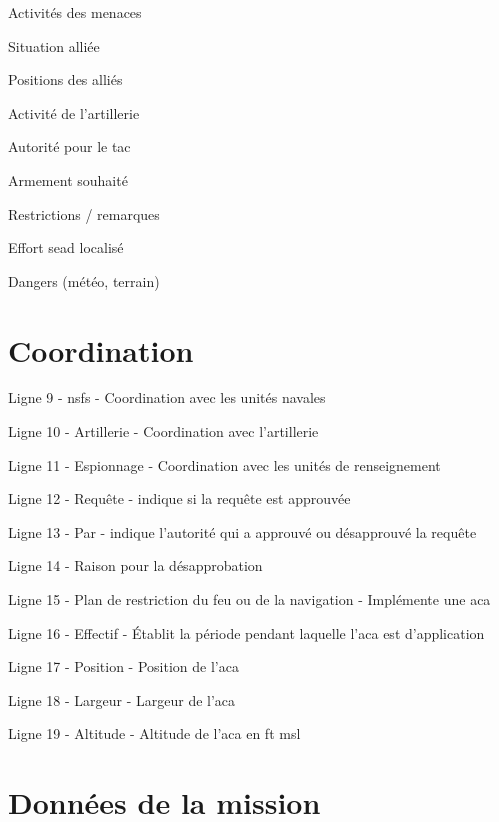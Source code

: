 \begin{e2}[0em]
\begin{e3}[0em]
		\item Activités des menaces
		\item Situation alliée
		\item Positions des alliés
		\item Activité de l'artillerie
		\item Autorité pour le \gls{tac}
		\item Armement souhaité
		\item Restrictions / remarques
		\item Effort \gls{sead} localisé
		\item Dangers (météo, terrain)
	\end{e3}
\end{e2}

\section{Coordination}

\begin{re2}
	\item Ligne 9 - \gls{nsfs} - Coordination avec les unités navales
	\item Ligne 10 - Artillerie - Coordination avec l'artillerie
	\item Ligne 11 - Espionnage - Coordination avec les unités de renseignement
	\item Ligne 12 - Requête -  indique si la requête est approuvée
	\item Ligne 13 - Par - indique l'autorité qui a approuvé ou désapprouvé la requête
	\item Ligne 14 - Raison pour la désapprobation
	\item Ligne 15 - Plan de restriction du feu ou de la navigation - Implémente une \gls{aca}
	\item Ligne 16 - Effectif - Établit la période pendant laquelle l'\gls{aca} est d'application
	\item Ligne 17 - Position - Position de l'\gls{aca}
	\item Ligne 18 - Largeur - Largeur de l'\gls{aca}
	\item Ligne 19 - Altitude - Altitude de l'\gls{aca} en \gls{ft} \gls{msl}
\end{re2}
	
\section{Données de la mission}	
	
